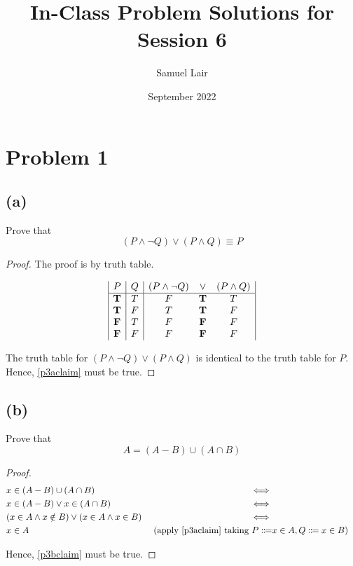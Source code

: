\documentclass{article}
\title{In-Class Problem Solutions for Session 6}
\author{Samuel Lair}
\date{September 2022}
\begin{document}
\maketitle
\tableofcontents

\pagebreak

\section{Problem 1}
\subsection{(a)}
Prove that
\begin{equation}\label{p3aclaim}
	(P \land \neg Q) \lor (P \land Q) \equiv P
\end{equation}
\begin{proof}
	The proof is by truth table.

	\[
		\begin{array}{|c|c|c c c|}
			P          & Q & (P \land \neg Q) & \lor       & (P \land Q) \\
			\hline
			\mathbf{T} & T & F                & \mathbf{T} & T           \\
			\mathbf{T} & F & T                & \mathbf{T} & F           \\
			\mathbf{F} & T & F                & \mathbf{F} & F           \\
			\mathbf{F} & F & F                & \mathbf{F} & F
		\end{array}
	\]

	The truth table for $(P \land \neg Q) \lor (P \land Q)$ is identical to the truth table for $P$. Hence, \eqref{p3aclaim} must be true.
\end{proof}

\subsection{(b)}
Prove that
\begin{equation}\label{p3bclaim}
	A = (A - B) \cup (A \cap B)
\end{equation}

\begin{proof}
	\begin{align*}
		 & x \in (A - B) \cup (A \cap B)                           & \iff                                                                                         \\
		 & x \in (A - B) \lor x \in (A \cap B)                     & \iff                                                                                         \\
		 & (x \in A \land x \notin B) \lor (x \in A \land x \in B) & \iff                                                                                         \\
		 & x \in A                                                 & \text{ (apply } \eqref{p3aclaim} \text{ taking } P \Coloneqq & x \in A, Q \Coloneqq x \in B) \\
	\end{align*}

	Hence, \eqref{p3bclaim} must be true.
\end{proof}
\end{document}
